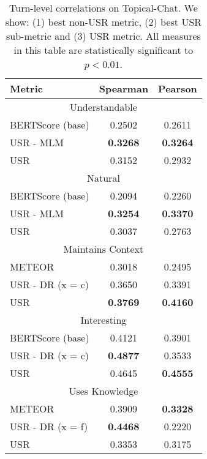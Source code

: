 \documentclass[11pt,a4paper]{article}
\begin{document}
\begin{table}
\centering
\begin{tabular}{|l|c|c|}
\hline
Metric                    & Spearman & Pearson  \\\hline
\multicolumn{3}{|c|}{Understandable} \\ \hline
BERTScore (base)          & 0.2502   & 0.2611   \\
USR - MLM                       & \textbf{0.3268}   & \textbf{0.3264}   \\
USR                       & 0.3152   & 0.2932   \\
\hline
\multicolumn{3}{|c|}{Natural} \\ \hline
BERTScore (base)          & 0.2094   & 0.2260   \\
USR - MLM                       & \textbf{0.3254}   & \textbf{0.3370}  \\
USR                       & 0.3037   & 0.2763   \\\hline
\multicolumn{3}{|c|}{Maintains Context} \\ \hline
METEOR                    & 0.3018   & 0.2495   \\
USR - DR (x = c)   & 0.3650  & 0.3391   \\
USR                       & \textbf{0.3769}   & \textbf{0.4160}   \\\hline
\multicolumn{3}{|c|}{Interesting} \\ \hline
BERTScore (base)          & 0.4121   & 0.3901  \\
USR - DR (x = c)   & \textbf{0.4877}   &  0.3533   \\
USR                       & 0.4645   & \textbf{0.4555}   \\\hline
\multicolumn{3}{|c|}{Uses Knowledge} \\ \hline
METEOR                    & 0.3909  & \textbf{0.3328}   \\
USR - DR (x = f)   & \textbf{0.4468}   &  0.2220   \\
USR                       & 0.3353   & 0.3175   \\\hline

\end{tabular}
\caption{Turn-level correlations on Topical-Chat. We show: (1) best non-USR metric, (2) best USR sub-metric and (3) USR metric. All measures in this table are statistically significant to $p < 0.01$.}
\label{tab:all_turn}
\end{table}
\end{document}
